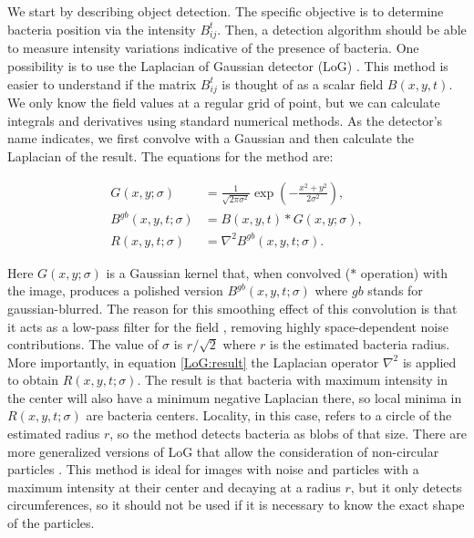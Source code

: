 We start by describing object detection. The specific objective is to determine bacteria position via the intensity $B_{ij}^t$. Then, a detection algorithm should be able to measure intensity variations indicative of the presence of bacteria. One possibility is to use the Laplacian of Gaussian detector (LoG) \cite{Kong2013AApplications,Sage2005AutomaticDynamics}. This method is easier to understand if the matrix $B_{ij}^t$ is thought of as a scalar field $B(x,y,t)$. We only know the field values at a regular grid of point, but we can calculate integrals and derivatives using standard numerical methods. As the detector's name indicates, we first convolve with a Gaussian and then calculate the Laplacian of the result. The equations for the method are:  

\begin{align}
	G(x,y;\sigma) &= \frac{1}{\sqrt{2\pi \sigma^2}} \exp\left(  -\frac{x^2+y^2}{2\sigma^2} \right), \\
	B^{gb}(x,y,t;\sigma) &= B(x,y,t) * G(x,y;\sigma), \\
	R(x,y,t;\sigma)  &= \nabla^2 B^{gb}(x,y,t;\sigma). \label{LoG:result}
\end{align}

Here $G(x,y;\sigma)$ is a Gaussian kernel that, when convolved ($*$ operation) with the image, produces a polished version $B^{gb}(x,y,t;\sigma)$ where $gb$ stands for gaussian-blurred. The reason for this smoothing effect of this convolution is that it acts as a low-pass filter for the field \cite{WaltzaAnMachines}, removing highly space-dependent noise contributions. The value of $\sigma$ is $r/\sqrt{2}$ where $r$ is the estimated bacteria radius. More importantly, in equation \ref{LoG:result} the Laplacian operator $\nabla^2$ is applied to obtain $R(x,y,t;\sigma)$. The result is that bacteria with maximum intensity in the center will also have a minimum negative Laplacian there, so local minima in $R(x,y,t;\sigma)$ are bacteria centers. Locality, in this case, refers to a circle of the estimated radius $r$, so the method detects bacteria as blobs of that size. There are more generalized versions of LoG that allow the consideration of non-circular particles \cite{Kong2013AApplications}. This method is ideal for images with noise and particles with a maximum intensity at their center and decaying at a radius $r$, but it only detects circumferences, so it should not be used if it is necessary to know the exact shape of the particles.

